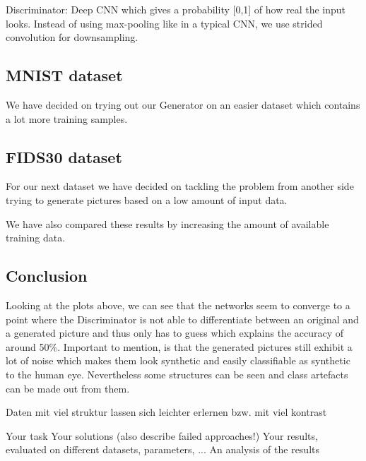 \documentclass{article}
\begin{document}
Discriminator: Deep CNN which gives a probability [0,1] of how real the input looks. Instead of using max-pooling like in a typical
CNN, we use strided convolution for downsampling.


\subsection{MNIST dataset}
We have decided on trying out our Generator on an easier dataset which contains a lot more training samples.



\subsection{FIDS30 dataset}
For our next dataset we have decided on tackling the problem from another side trying to generate pictures based on a low amount of input data.

We have also compared these results by increasing the amount of available training data.






\subsection{Conclusion}

Looking at the plots above, we can see that the networks seem to converge to a point where the Discriminator is not able to
differentiate between an original and a generated picture and thus only has to guess which explains the accuracy of around 50\%.
Important to mention, is that the generated pictures still exhibit a lot of noise which makes them look synthetic and easily
classifiable as synthetic to the human eye.
Nevertheless some structures can be seen and class artefacts can be made out from them.

Daten mit viel struktur lassen sich leichter erlernen bzw. mit viel kontrast

Your task
Your solutions (also describe failed approaches!)
Your results, evaluated on different datasets, parameters, ...
An analysis of the results

\end{document}
